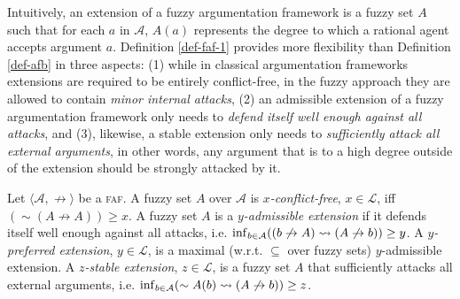 \documentclass[12pt,a4paper]{article}
\newcommand{\mc}[1]{\ensuremath{\mathcal{#1}}}
\newcommand{\abfaf}{\textsc{faf}}
\newcommand{\attack}{\ensuremath{\not\rightarrow}}
\newcommand{\af}[2]{\ensuremath{\langle{#1},{#2}\rangle}}
\newcommand{\Lattice}{\ensuremath{\mc{L}}}
\newcommand{\fneg}{\ensuremath{\sim}}
\newcommand{\fullimg}[2]{\ensuremath{{}^{#2}{#1}}}
\begin{document}
Intuitively, an extension of a fuzzy argumentation framework is a fuzzy set $A$ such that for each $a$ in $\mc{A}$, $A(a)$ represents the degree to which a rational agent accepts argument $a$. Definition \ref{def-faf-1} provides more flexibility than Definition \ref{def-afb} in three aspects: (1) while in classical argumentation frameworks extensions are required to be entirely conflict-free, in the fuzzy approach they are allowed to contain {\em minor internal attacks}, (2) an admissible extension of a fuzzy argumentation framework only needs to {\em defend itself well enough against all attacks}, and (3), likewise, a stable extension only needs to {\em sufficiently attack all external arguments}, in other words, any argument that is to a high degree outside of the extension should be strongly attacked by it.

\begin{definition}\label{def-faf-1}
Let \af{\mc{A}}{\attack} be a \abfaf{}.
A fuzzy set $A$  over $\mc{A}$ is
\emph{$x$-conflict-free}, $x\in\Lattice{}$, iff $(\fneg (A \attack A)) \geq x$.
A fuzzy set $A$ is a \emph{$y$-admissible extension}
if it defends itself well enough against all attacks, i.e. 
$\infof{b\in\mc{A}}{(b \attack A) \fimp (A \attack b)} \geq y$.
A \emph{$y$-preferred extension}, $y \in \Lattice{}$, is a maximal (w.r.t. $\subseteq$ 
over fuzzy sets) $y$-admissible extension.  
A \emph{$z$-stable extension}, $z\in\Lattice{}$, is a fuzzy set $A$ that sufficiently attacks all external arguments, i.e.
$\infof{b\in\mc{A}}{\fimplies{\fneg A(b)}{(A \attack b)}} \geq z$.
\end{definition}
%
%
%

\end{document}
